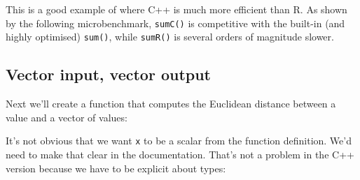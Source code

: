This is a good example of where C++ is much more efficient than R. As
shown by the following microbenchmark, \texttt{sumC()} is competitive
with the built-in (and highly optimised) \texttt{sum()}, while
\texttt{sumR()} is several orders of magnitude slower.

\begin{Shaded}
\begin{Highlighting}[]
\StringTok{ }\NormalTok{(}\NormalTok{)}
\NormalTok{(}
\NormalTok{)}
\end{Highlighting}
\end{Shaded}

\subsection{Vector input, vector output}

Next we'll create a function that computes the Euclidean distance
between a value and a vector of values:

\begin{Shaded}
\begin{Highlighting}[]
\StringTok{ }
  \StringTok{ }\StringTok{ }\NormalTok{)}
\NormalTok{\}}
\end{Highlighting}
\end{Shaded}

It's not obvious that we want \texttt{x} to be a scalar from the
function definition. We'd need to make that clear in the documentation.
That's not a problem in the C++ version because we have to be explicit
about types:

\begin{Shaded}
\begin{Highlighting}[]
\NormalTok{(}

\StringTok{  \}}
\NormalTok{)}
\end{Highlighting}
\end{Shaded}


